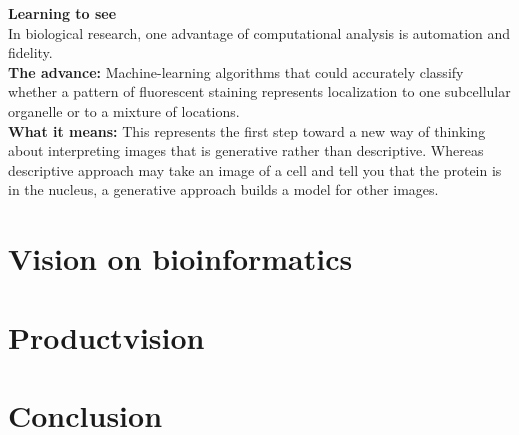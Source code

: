 \documentclass[10pt,a4paper]{report}
\begin{document}
\textbf{Learning to see}\\
In biological research, one advantage of computational analysis is automation and fidelity.\\
\textbf{The advance:} Machine-learning algorithms that could accurately classify whether a pattern of fluorescent staining represents localization to one subcellular organelle or to a mixture of locations.\\
\textbf{What it means:} This represents the first step toward a new way of thinking about interpreting images that is generative rather than descriptive.
Whereas descriptive approach may take an image of a cell and tell you that the protein is in the nucleus, a generative approach builds a model for other images.
\newpage
\section*{Vision on bioinformatics}
\section*{Productvision}
\section*{Conclusion}
\end{document}
